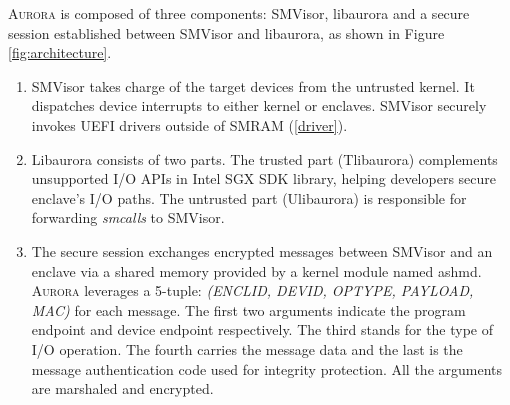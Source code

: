 \documentclass[journal,twocolumn,letterpaper,10pt]{IEEEtran}
\begin{document}
\textsc{Aurora} is composed of three components: SMVisor, libaurora and a secure session established between SMVisor and libaurora, as shown in Figure \ref{fig:architecture}.

\begin{enumerate}%
\item SMVisor takes charge of the target devices from the untrusted kernel. It dispatches device interrupts to either kernel or enclaves. SMVisor securely invokes UEFI drivers outside of SMRAM (\autoref{driver}).
\item Libaurora consists of two parts. The trusted part (Tlibaurora) complements unsupported I/O APIs in Intel SGX SDK library, helping developers secure enclave's I/O paths. The untrusted part (Ulibaurora) is responsible for forwarding \textit{smcalls} to SMVisor.  %
\item The secure session exchanges encrypted messages between SMVisor and an enclave via a shared memory provided by a kernel module named ashmd.  \textsc{Aurora} leverages a 5-tuple: \textit{(ENCLID, DEVID, OPTYPE, PAYLOAD, MAC)} for each message. The first two arguments indicate the program endpoint and device endpoint respectively.  The third stands for the type of I/O operation. The fourth carries the message data and the last is the message authentication code used for integrity protection. All the arguments are marshaled and encrypted. 

\end{enumerate}
\end{document}
